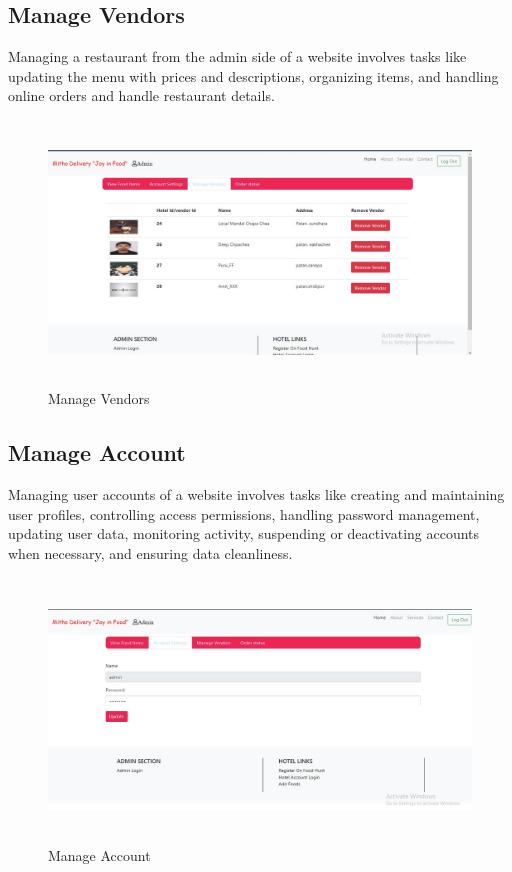 \newpage
\subsection{Manage Vendors}
Managing a restaurant from the admin side of a website involves tasks like updating the menu with prices and descriptions, organizing items, and handling online orders and handle restaurant details.
\begin{figure}[h]
    \centering
    \includegraphics[height=7cm]{img/Graphics/hotel manage vendor (1).JPG}
    \caption{Manage Vendors}
\end{figure}

\subsection{Manage Account}
Managing user accounts of a website involves tasks like creating and maintaining user profiles, controlling access permissions, handling password management, updating user data, monitoring activity, suspending or deactivating accounts when necessary, and ensuring data cleanliness.
\begin{figure}[h]
    \centering
    \includegraphics[height=7cm]{img/Graphics/admin manage account.JPG}
    \caption{Manage Account}
\end{figure}


